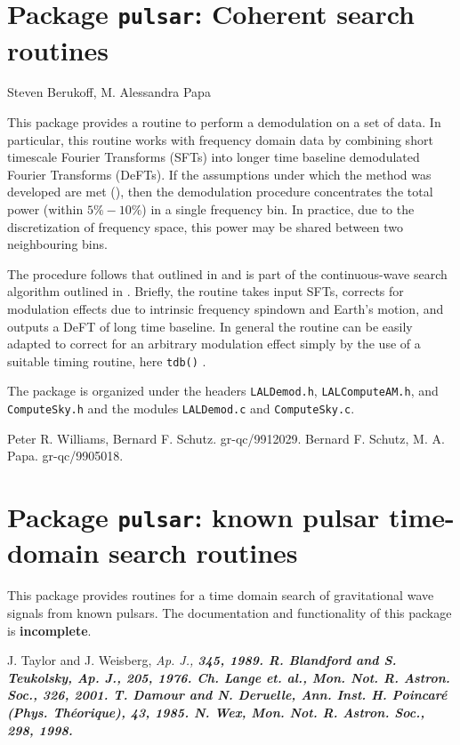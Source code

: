 \chapter{Package \texttt{pulsar}: Coherent search routines}
Steven Berukoff, M. Alessandra Papa
\bigskip

This package provides a routine to perform a demodulation on a set of data.
In particular, this routine works with frequency domain data by combining
short timescale Fourier Transforms (SFTs) into longer time baseline
demodulated Fourier Transforms (DeFTs). If the assumptions under which the
method was developed are met (\cite{Williams:1999}), then the demodulation
procedure concentrates the total power (within $5\%-10\%$) in a single
frequency bin. In practice, due to the discretization of frequency space, this
power may be shared between two neighbouring bins.

The procedure follows that outlined in \cite{Williams:1999} and is part of the
continuous-wave search algorithm outlined in \cite{Schutz:1999}.  Briefly, the
routine takes input SFTs, corrects for modulation effects due to intrinsic
frequency spindown and Earth's motion, and outputs a DeFT of long time
baseline. In general the routine can be easily adapted to correct for an
arbitrary modulation effect simply by the use of a suitable timing routine,
here \verb+tdb()+ .

The package is organized under the headers \verb+LALDemod.h+, \verb+LALComputeAM.h+, and
\verb+ComputeSky.h+ and the modules \verb+LALDemod.c+ and \verb+ComputeSky.c+.


\newpage
\newpage
\newpage
\newpage

\newpage\begin{thebibliography}{0}
        Peter R. Williams, Bernard F. Schutz.  gr-qc/9912029.
        Bernard F. Schutz, M. A. Papa.  gr-qc/9905018.
\end{thebibliography}

\chapter{Package \texttt{pulsar}: known pulsar time-domain search routines}

This package provides routines for a time domain search of gravitational wave
signals from known pulsars.  The documentation and functionality of this
package is \textbf{incomplete}.
\newpage
\newpage\begin{thebibliography}{0}
        J. Taylor and J. Weisberg, \it{Ap. J.}, \bf{345}, 1989.
        R. Blandford and S. Teukolsky, \it{Ap. J.}, \bf{205}, 1976.
        Ch. Lange {\it et. al.}, \it{Mon. Not. R. Astron. Soc.}, \bf{326}, 2001.
        T. Damour and N. Deruelle, \it{Ann. Inst. H. Poincar\'e (Phys. Th\'eorique)}, \bf{43}, 1985.
        N. Wex, \it{Mon. Not. R. Astron. Soc.}, \bf{298}, 1998.
\end{thebibliography}
\newpage
\newpage

